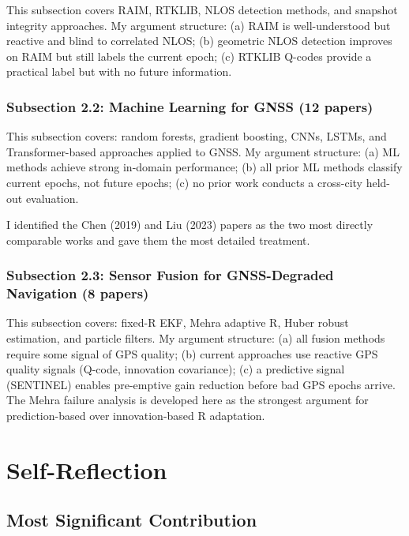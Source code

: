 \documentclass[12pt,a4paper]{article}
\begin{document}
This subsection covers RAIM, RTKLIB, NLOS detection methods, and snapshot integrity
approaches.
My argument structure: (a) RAIM is well-understood but reactive and blind to correlated
NLOS; (b) geometric NLOS detection \cite{hsu2018nlos} improves on RAIM but still labels
the current epoch; (c) RTKLIB Q-codes provide a practical label but with no future
information.

\subsubsection{Subsection 2.2: Machine Learning for GNSS (12 papers)}

This subsection covers: random forests, gradient boosting, CNNs, LSTMs, and
Transformer-based approaches applied to GNSS.
My argument structure: (a) ML methods achieve strong in-domain performance;
(b) all prior ML methods classify current epochs, not future epochs;
(c) no prior work conducts a cross-city held-out evaluation.

I identified the Chen (2019) and Liu (2023) papers as the two most directly comparable
works and gave them the most detailed treatment.

\subsubsection{Subsection 2.3: Sensor Fusion for GNSS-Degraded Navigation (8 papers)}

This subsection covers: fixed-R EKF, Mehra adaptive R, Huber robust estimation,
and particle filters.
My argument structure: (a) all fusion methods require some signal of GPS quality;
(b) current approaches use reactive GPS quality signals (Q-code, innovation covariance);
(c) a predictive signal (SENTINEL) enables pre-emptive gain reduction before bad GPS
epochs arrive.
The Mehra failure analysis \cite{mehra1970} is developed here as the strongest argument
for prediction-based over innovation-based R adaptation.

\section{Self-Reflection}

\subsection{Most Significant Contribution}
\end{document}
